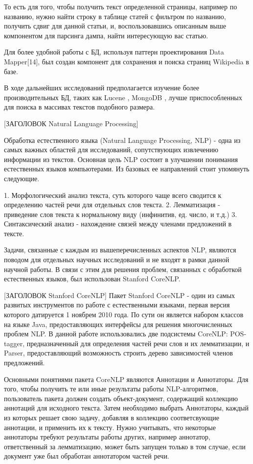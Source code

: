 То есть для того, чтобы получить текст определенной страницы, например по названию,
нужно найти строку в таблице статей с фильтром по названию,
получить сдвиг для данной статьи, и, воспользовавшись
описанным выше компонентом для парсинга дампа, найти интересующую вас статью.

Для более удобной работы с БД, используя паттерн проектирования Data Mapper[14], 
был создан компонент для сохранения и поиска страниц Wikipedia в базе.

В ходе дальнейших исследований предполагается изучение более производительных БД, таких
как Lucene \cite{lucene}, MongoDB \cite{mongoDB}, лучше приспособленных для поиска в
массивах текстов подобного размера.

[ЗАГОЛОВОК Natural Language Processing]

Обработка естественного языка (Natural Language Processing, NLP)\cite{textminingsurvey} - одна из самых 
важных областей для исследований, сопутствующих извлечению информации из текстов.
Основная цель NLP состоит в улучшении понимания естественных языков компьютерами.
Из базовых ее направлений стоит упомянуть следующие.

1. Морфологический анализ текста, суть которого чаще всего сводится к определению
частей речи для отдельных слов текста.
2. Лемматизация - приведение слов текста к нормальному виду (инфинитив, ед. число, и т.д.)
3. Синтаксический анализ - нахождение связей между членами предложений в тексте.

Задачи, связанные с каждым из вышеперечисленных аспектов NLP, 
являются поводом для отдельных научных исследований и не входят в рамки данной научной работы.
В связи с этим для решения проблем, связанных с обработкой естественных языков, был использован Stanford CoreNLP.

[ЗАГОЛОВОК Stanford CoreNLP]
Пакет Stanford CoreNLP\cite{corenlp} - один из самых развитых инструментов по работе 
с естественными языками, первая версия которого датируется 1 ноябрем 2010 года.
По сути он является набором классов на языке Java, предоставляющих интерфейсы
для решения многочисленных проблем NLP. В данной работе использовались две подсистемы CoreNLP:
POS-tagger, предназначенный для определения частей речи слов и их лемматизации,
и Parser, предоставляющий возможность строить дерево зависимостей членов предложений.

Основными понятиями пакета CoreNLP являются Аннотации и Аннотаторы. 
Для того, чтобы получить те или иные результаты работы NLP-алгоритмов,
пользователь пакета должен создать объект-документ,
содержащий коллекцию аннотаций для исходного текста. 
Затем необходимо выбрать Аннотаторы, каждый из которых решает свою задачу, 
добавляя в коллекцию соответсвующие аннотации, и применить их к тексту. 
Нужно учитывать, что некоторые аннотаторы требуют результаты работы других,
например аннотатор, ответственный за лемматизацию, может быть запущен
только в том случае, если документ уже был обработан аннотатором частей речи.

